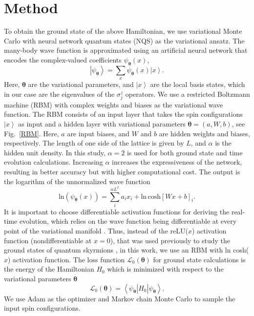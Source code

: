 \documentclass[aps,prb,twocolumn,superscriptaddress,a4paper,longbibliography]{revtex4-2}
\begin{document}
\section{Method}
\label{method}

To obtain the ground state of the above Hamiltonian, we use variational Monte Carlo with neural network quantum states (NQS) as the variational ansatz. The many-body wave function is approximated using an artificial neural network that encodes the complex-valued coefficients $\psi_{\boldsymbol{\theta}}(x)$,
\begin{equation}
    \left|\psi_{\boldsymbol{\theta}}\right>=\sum_{x}\psi_{\boldsymbol{\theta}}(x)\left|x\right>.
\end{equation}
Here, $\boldsymbol{\theta}$ are the variational parameters, and $\left|x\right>$ are the local basis states, which in our case are the eigenvalues of the $\sigma^z_j$ operators. We use a restricted Boltzmann machine (RBM) with complex weights and biases as the variational wave function. The RBM consists of an input layer that takes the spin configurations $\left|x\right>$ as input and a hidden layer with variational parameters $\boldsymbol{\theta}=(a,W,b)$, see Fig.~\ref{RBM}. Here, $a$ are input biases, and $W$ and $b$ are hidden weights and biases, respectively. The length of one side of the lattice is given by $L$, and $\alpha$ is the hidden unit density. In this study, $\alpha=2$ is used for both ground state and time evolution calculations. Increasing $\alpha$ increases the expressiveness of the network, resulting in better accuracy but with higher computational cost. The output is the logarithm of the unnormalized wave function
\begin{equation}
    \text{ln}(\psi_{\boldsymbol{\theta}}(x))= \sum_i^{\alpha L^2}a_ix_i + \text{ln}\,\text{cosh}[Wx+b]_i.
    \label{NN_eqn}
\end{equation}
It is important to choose differentiable activation functions for deriving the real-time evolution, which relies on the wave function being differentiable at every point of the variational manifold \cite{schmitt_quantum_2020}. Thus, instead of the reLU($x$) activation function (nondifferentiable at $x=0$), that was used previously to study the ground states of quantum skyrmions \cite{joshi_ground_2023}, in this work, we use an RBM with ln cosh($x$) activation function. The loss function $\mathcal{L}_0(\boldsymbol{\theta})$ for ground state calculations is the energy of the Hamiltonian $H_0$ which is minimized with respect to the variational parameters $\boldsymbol{\theta}$
\begin{equation}
    \mathcal{L}_0(\boldsymbol{\theta})=\left<\psi_{\boldsymbol{\theta}}\right|H_0\left|\psi_{\boldsymbol{\theta}}\right>.
\end{equation}
We use Adam \cite{kingma_adam_2017} as the optimizer and Markov chain Monte Carlo to sample the input spin configurations. 
\end{document}
